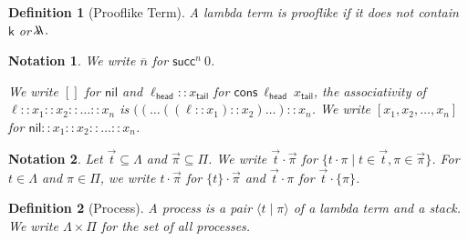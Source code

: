 \documentclass{article}
\newcommand{\successor}{\mathsf{succ}}
\newcommand{\proc}[2]{\langle{#1}\mid{#2}\rangle}
\newcommand{\oracle}[2]{\lambda\mkern-15mu\lambda\ #1. #2}
\newcommand{\cont}{\mathsf{k}}
\newcommand{\cons}{\mathsf{cons}}
\newcommand{\nil}{\mathsf{nil}}
\newtheorem{definition}{Definition}
\newtheorem{notation}{Notation}
\begin{document}
\begin{definition}[Prooflike Term]
    A lambda term is prooflike if it does not contain $\cont{}$ or $\oracle{}{}$
\end{definition}

\begin{notation}
    We write $\overline{n}$ for $\successor^n\ 0$.

    We write $[]$ for $\nil$ and $\ell_\mathsf{head} :: x_\mathsf{tail}$ for $\cons\ \ell_\mathsf{head}\ x_\mathsf{tail}$, the associativity of $\ell :: x_1 :: x_2 :: \dots :: x_n$ is $((\dots((\ell :: x_1) :: x_2) \dots ) :: x_n$.
    We write $[x_1, x_2, \dots, x_n]$ for $\nil :: x_1 :: x_2 :: \dots :: x_n$.
\end{notation}

\begin{notation}
    Let $\vec{t} \subseteq \Lambda$ and $\vec{\pi} \subseteq \Pi$.
    We write $\vec{t} \cdot \vec{\pi}$ for $\{ t \cdot \pi \mid t \in \vec{t}, \pi \in \vec\pi \}$.
    For $t \in \Lambda$ and $\pi \in \Pi$, we write $t \cdot \vec\pi$ for $\{ t \} \cdot \vec\pi$ and $\vec{t} \cdot \pi$ for $\vec{t} \cdot \{ \pi \}$.
\end{notation}

\begin{definition}[Process]
    A process is a pair $\proc{t}{\pi}$ of a lambda term and a stack.
    We write $\Lambda \times \Pi$ for the set of all processes.
\end{definition}
\end{document}
